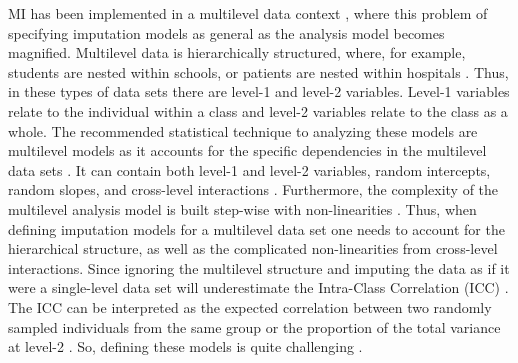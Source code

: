 \documentclass[10pt, a4paper, titlepage]{article}
\begin{document}
MI has been implemented in a multilevel data context \citep{mistlerComparisonJointModel2017, enders2018, enders2018a, enders2020, buurenFlexibleImputationMissing2018, taljaard2008, enders2016, resche-rigon2018, audigier2018, dong2023, grund2016, grund2018a, grund2018, ludtke2017, grund2021, quartagno2022}, where this problem of specifying imputation models as general as the analysis model becomes magnified. Multilevel data is hierarchically structured, where, for example, students are nested within schools, or patients are nested within hospitals \citep{hox2017, hox2011}. Thus, in these types of data sets there are level-1 and level-2 variables. Level-1 variables relate to the individual within a class and level-2 variables relate to the class as a whole. The recommended statistical technique to analyzing these models are multilevel models as it accounts for the specific dependencies in the multilevel data sets \citep{hox2017, hox2011, ludtke2017}. It can contain both level-1 and level-2 variables, random intercepts, random slopes, and cross-level interactions \citep{hox2017, hox2011}. Furthermore, the complexity of the multilevel analysis model is built step-wise with non-linearities \citep{hox2017, hox2011}. Thus, when defining imputation models for a multilevel data set one needs to account for the hierarchical structure, as well as the complicated non-linearities from cross-level interactions. Since ignoring the multilevel structure and imputing the data as if it were a single-level data set will underestimate the Intra-Class Correlation (ICC) \citep{buurenFlexibleImputationMissing2018, ludtke2017, taljaard2008, hox2011}. The ICC can be interpreted as the expected correlation between two randomly sampled individuals from the same group or the proportion of the total variance at level-2 \citep{gulliford2005, shieh2012, hox2011}. So, defining these models is quite challenging \citep{buurenFlexibleImputationMissing2018, burgette2010, hox2011}.
\end{document}

